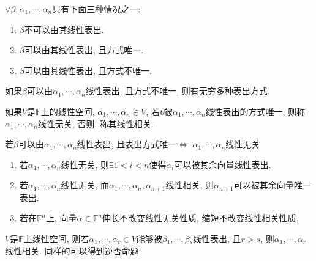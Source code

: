\begin{theorem}
    $\forall \beta, \alpha{_1}, \cdots, \alpha{_n}$只有下面三种情况之一:
    \begin{enumerate}[itemindent=1em]
        \item $\beta$不可以由其线性表出.
        \item $\beta$可以由其线性表出, 且方式唯一.
        \item $\beta$可以由其线性表出, 且方式不唯一.
    \end{enumerate}
\end{theorem}

\begin{theorem}
    如果$\beta$可以由$\alpha{_1}, \cdots, \alpha{_n}$线性表出, 且方式不唯一, 则有无穷多种表出方式.
\end{theorem}

\begin{definition}[线性相关]
    如果$V$是$\mathbb{F}$上的线性空间, $\alpha{_1}, \cdots, \alpha{_n} \in V$, 若\emph{0}被$\alpha{_1}, \cdots, \alpha{_n}$线性表出的方式唯一, 则称$\alpha{_1}, \cdots, \alpha{_n}$线性无关, 否则, 称其线性相关.
\end{definition}

\begin{inference}
    若$\beta$可以由$\alpha{_1}, \cdots, \alpha{_n}$线性表出, 且表出方式唯一$\Longleftrightarrow$ $\alpha{_1}, \cdots, \alpha{_n}$线性无关
\end{inference}

\begin{property}
    \par
    \begin{enumerate}[itemindent=1em]
        \item 若$\alpha{_1}, \cdots, \alpha{_n}$线性无关, 则$\exists 1 < i < n$使得$\alpha{_i}$可以被其余向量线性表出.
        \item 若$\alpha{_1}, \cdots, \alpha{_n}$线性无关, 而$\alpha{_1}, \cdots, \alpha{_n}, \alpha{_{n+1}}$线性相关, 则$\alpha{_{n+1}}$可以被其余向量唯一表出.
        \item 若在$\mathbb{F}^n$上, 向量$\alpha \in \mathbb{F}^n$伸长不改变线性无关性质, 缩短不改变线性相关性质.
    \end{enumerate}
\end{property}

\begin{lemma}[基本引理]
    $V$是$\mathbb{F}$上线性空间, 则若$\alpha{_1}, \cdots, \alpha{_r} \in V$能够被$\beta{_1}, \cdots, \beta{_s}$线性表出, 且$r>s$, 则$\alpha{_1}, \cdots, \alpha{_r}$线性相关.
    同样的可以得到逆否命题.
\end{lemma}

